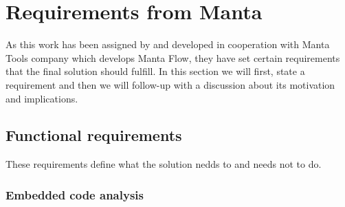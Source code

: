\section{Requirements from Manta}

As this work has been assigned by and developed in cooperation with Manta Tools company which develops Manta Flow, they have set certain requirements that the final solution should fulfill. In this section we will first, state a requirement and then we will follow-up with a discussion about its motivation and implications.

\subsection{Functional requirements}

These requirements define what the solution nedds to and needs not to do.

\subsubsection{Embedded code analysis}

